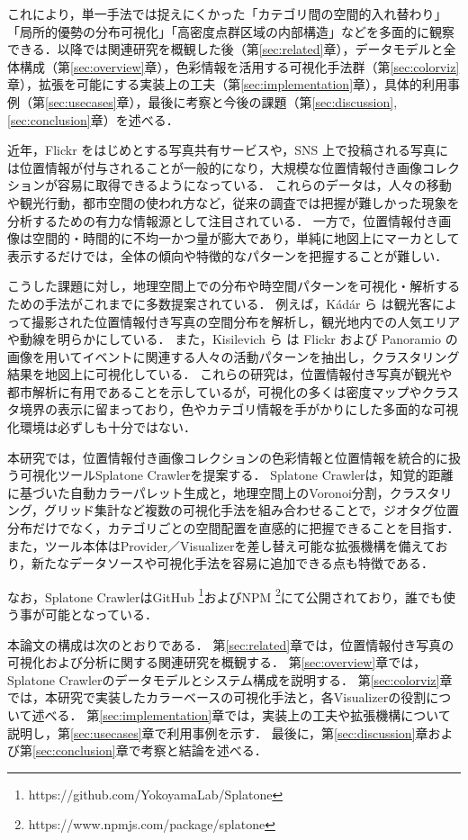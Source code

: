 \documentclass[11pt,a4paper]{jlreq}
\begin{document}
これにより，単一手法では捉えにくかった「カテゴリ間の空間的入れ替わり」「局所的優勢の分布可視化」「高密度点群区域の内部構造」などを多面的に観察できる．以降では関連研究を概観した後（第\ref{sec:related}章），データモデルと全体構成（第\ref{sec:overview}章），色彩情報を活用する可視化手法群（第\ref{sec:colorviz}章），拡張を可能にする実装上の工夫（第\ref{sec:implementation}章），具体的利用事例（第\ref{sec:usecases}章），最後に考察と今後の課題（第\ref{sec:discussion},\ref{sec:conclusion}章）を述べる．

近年，Flickr をはじめとする写真共有サービスや，SNS 上で投稿される写真には位置情報が付与されることが一般的になり，大規模な位置情報付き画像コレクションが容易に取得できるようになっている．
これらのデータは，人々の移動や観光行動，都市空間の使われ方など，従来の調査では把握が難しかった現象を分析するための有力な情報源として注目されている．
一方で，位置情報付き画像は空間的・時間的に不均一かつ量が膨大であり，単純に地図上にマーカとして表示するだけでは，全体の傾向や特徴的なパターンを把握することが難しい．

こうした課題に対し，地理空間上での分布や時空間パターンを可視化・解析するための手法がこれまでに多数提案されている．
例えば，K{\'a}d{\'a}r ら\cite{kadar2013wheredotouristsgo} は観光客によって撮影された位置情報付き写真の空間分布を解析し，観光地内での人気エリアや動線を明らかにしている．
また，Kisilevich ら\cite{kisilevich2010eventbased} は Flickr および Panoramio の画像を用いてイベントに関連する人々の活動パターンを抽出し，クラスタリング結果を地図上に可視化している．
これらの研究は，位置情報付き写真が観光や都市解析に有用であることを示しているが，可視化の多くは密度マップやクラスタ境界の表示に留まっており，色やカテゴリ情報を手がかりにした多面的な可視化環境は必ずしも十分ではない．

本研究では，位置情報付き画像コレクションの色彩情報と位置情報を統合的に扱う可視化ツールSplatone Crawlerを提案する．
Splatone Crawlerは，知覚的距離に基づいた自動カラーパレット生成と，地理空間上のVoronoi分割，クラスタリング，グリッド集計など複数の可視化手法を組み合わせることで，ジオタグ位置分布だけでなく，カテゴリごとの空間配置を直感的に把握できることを目指す．
また，ツール本体はProvider／Visualizerを差し替え可能な拡張機構を備えており，新たなデータソースや可視化手法を容易に追加できる点も特徴である．

なお，Splatone CrawlerはGitHub \footnote{https://github.com/YokoyamaLab/Splatone}およびNPM \footnote{https://www.npmjs.com/package/splatone}にて公開されており，誰でも使う事が可能となっている．

本論文の構成は次のとおりである．
第\ref{sec:related}章では，位置情報付き写真の可視化および分析に関する関連研究を概観する．
第\ref{sec:overview}章では，Splatone Crawlerのデータモデルとシステム構成を説明する．
第\ref{sec:colorviz}章では，本研究で実装したカラーベースの可視化手法と，各Visualizerの役割について述べる．
第\ref{sec:implementation}章では，実装上の工夫や拡張機構について説明し，第\ref{sec:usecases}章で利用事例を示す．
最後に，第\ref{sec:discussion}章および第\ref{sec:conclusion}章で考察と結論を述べる．
\end{document}

